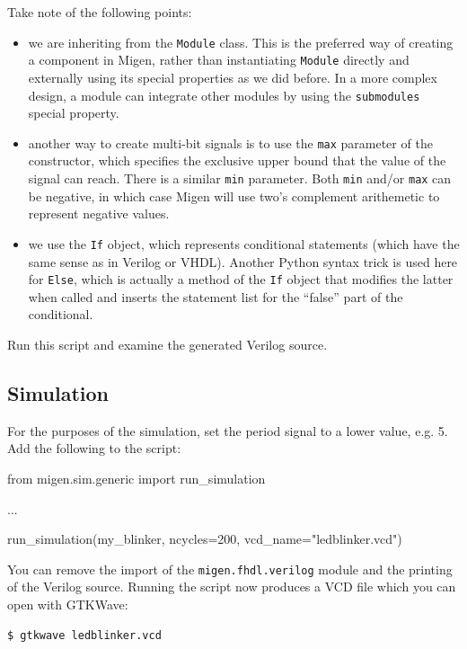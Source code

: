 \documentclass[11pt]{paper}
\begin{document}
Take note of the following points:
\begin{itemize}
\item we are inheriting from the \verb!Module! class. This is the preferred way of creating a component in Migen, rather than instantiating \verb!Module! directly and externally using its special properties as we did before. In a more complex design, a module can integrate other modules by using the \verb!submodules! special property.
\item another way to create multi-bit signals is to use the \verb!max! parameter of the constructor, which specifies the exclusive upper bound that the value of the signal can reach. There is a similar \verb!min! parameter. Both \verb!min! and/or \verb!max! can be negative, in which case Migen will use two's complement arithemetic to represent negative values.
\item we use the \verb!If! object, which represents conditional statements (which have the same sense as in Verilog or VHDL). Another Python syntax trick is used here for \verb!Else!, which is actually a method of the \verb!If! object that modifies the latter when called and inserts the statement list for the ``false'' part of the conditional.
\end{itemize}

Run this script and examine the generated Verilog source.


\subsection{Simulation}
For the purposes of the simulation, set the period signal to a lower value, e.g. 5. Add the following to the script:
\begin{verbatimtab}
from migen.sim.generic import run_simulation

...

run_simulation(my_blinker, ncycles=200, vcd_name="ledblinker.vcd")
\end{verbatimtab}

You can remove the import of the \verb!migen.fhdl.verilog! module and the printing of the Verilog source. Running the script now produces a VCD file which you can open with GTKWave:
\begin{verbatim}
$ gtkwave ledblinker.vcd
\end{verbatim}
\end{document}
